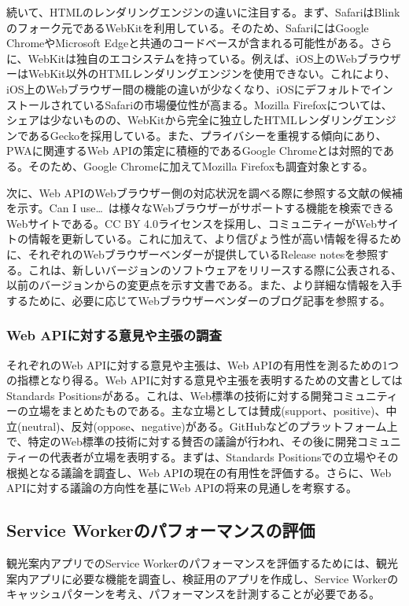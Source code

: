 続いて、HTMLのレンダリングエンジンの違いに注目する。まず、SafariはBlinkのフォーク元であるWebKitを利用している。そのため、SafariにはGoogle ChromeやMicrosoft Edgeと共通のコードベースが含まれる可能性がある。さらに、WebKitは独自のエコシステムを持っている。例えば、iOS上のWebブラウザーはWebKit以外のHTMLレンダリングエンジンを使用できない。これにより、iOS上のWebブラウザー間の機能の違いが少なくなり、iOSにデフォルトでインストールされているSafariの市場優位性が高まる。Mozilla Firefoxについては、シェアは少ないものの、WebKitから完全に独立したHTMLレンダリングエンジンであるGeckoを採用している。また、プライバシーを重視する傾向にあり、PWAに関連するWeb APIの策定に積極的であるGoogle Chromeとは対照的である。そのため、Google Chromeに加えてMozilla Firefoxも調査対象とする。

次に、Web APIのWebブラウザー側の対応状況を調べる際に参照する文献の候補を示す。Can I use…~\cite{CanIUse}は様々なWebブラウザーがサポートする機能を検索できるWebサイトである。CC BY 4.0ライセンスを採用し、コミュニティーがWebサイトの情報を更新している。これに加えて、より信ぴょう性が高い情報を得るために、それぞれのWebブラウザーベンダーが提供しているRelease notesを参照する。これは、新しいバージョンのソフトウェアをリリースする際に公表される、以前のバージョンからの変更点を示す文書である。また、より詳細な情報を入手するために、必要に応じてWebブラウザーベンダーのブログ記事を参照する。
\subsubsection{Web APIに対する意見や主張の調査}\label{subsubsection:Web APIに対する意見や主張の調査}
それぞれのWeb APIに対する意見や主張は、Web APIの有用性を測るための1つの指標となり得る。Web APIに対する意見や主張を表明するための文書としてはStandards Positionsがある。これは、Web標準の技術に対する開発コミュニティーの立場をまとめたものである。主な立場としては賛成(support、positive)、中立(neutral)、反対(oppose、negative)がある。GitHubなどのプラットフォーム上で、特定のWeb標準の技術に対する賛否の議論が行われ、その後に開発コミュニティーの代表者が立場を表明する。まずは、Standards Positionsでの立場やその根拠となる議論を調査し、Web APIの現在の有用性を評価する。さらに、Web APIに対する議論の方向性を基にWeb APIの将来の見通しを考察する。
\subsection{Service Workerのパフォーマンスの評価}\label{subsection:Service Workerのパフォーマンスの評価}
観光案内アプリでのService Workerのパフォーマンスを評価するためには、観光案内アプリに必要な機能を調査し、検証用のアプリを作成し、Service Workerのキャッシュパターンを考え、パフォーマンスを計測することが必要である。


